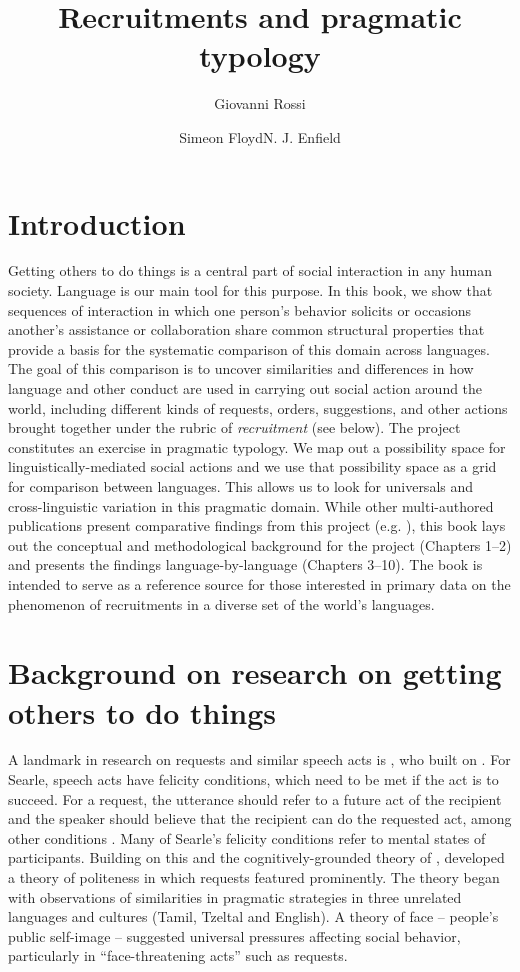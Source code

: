 \documentclass[output=paper,modfonts,nonflat]{langsci/langscibook}
\author{Giovanni Rossi\affiliation{Department of Sociology, University of California, Los Angeles}\and Simeon Floyd\affiliation{Department of Anthropology, Universidad San Francisco de Quito}\lastand N. J. Enfield\affiliation{Department of Linguistics, The University of Sydney}}
\title{Recruitments and pragmatic typology}
\begin{document}
\maketitle
\label{sec:intro}

\section{Introduction}\label{sec:intro:1}

Getting others to do things is a central part of social interaction in any human society. Language is our main tool for this purpose. In this book, we show that sequences of interaction in which one person’s behavior solicits or occasions another’s assistance or collaboration share common structural properties that provide a basis for the systematic comparison of this domain across languages. The goal of this comparison is to uncover similarities and differences in how language and other conduct are used in carrying out social action around the world, including different kinds of requests, orders, suggestions, and other actions brought together under the rubric of \textit{recruitment} (see  below). The project constitutes an exercise in pragmatic typology. We map out a possibility space for linguistically-mediated social actions and we use that possibility space as a grid for comparison between languages. This allows us to look for universals and cross-linguistic variation in this pragmatic domain. While other multi-authored publications present comparative findings from this project (e.g. \citealt{FloydEtAl2018}), this book lays out the conceptual and methodological background for the project (Chapters 1--2) and presents the findings language-by-language (Chapters 3--10). The book is intended to serve as a reference source for those interested in primary data on the phenomenon of recruitments in a diverse set of the world’s languages.

\section{Background on research on getting others to do things}\label{sec:intro:2}

A landmark in research on requests and similar speech acts is \citet{Searle1969,Searle1975}, who built on \citet{Austin1962}. For Searle, speech acts have felicity conditions, which need to be met if the act is to succeed. For a request, the utterance should refer to a future act of the recipient and the speaker should believe that the recipient can do the requested act, among other conditions \citep[66]{Searle1969}. Many of Searle’s felicity conditions refer to mental states of participants. Building on this and the cognitively-grounded theory of \citet{Grice1975}, \citet{BrownLevinson1978,BrownLevinson1987} developed a theory of politeness in which requests featured prominently. The theory began with observations of similarities in pragmatic strategies in three unrelated languages and cultures (Tamil, Tzeltal and English). A theory of face -- people’s public self-image \citep{Goffman1967} -- suggested universal pressures affecting social behavior, particularly in “face-threatening acts” such as requests.
\end{document}
